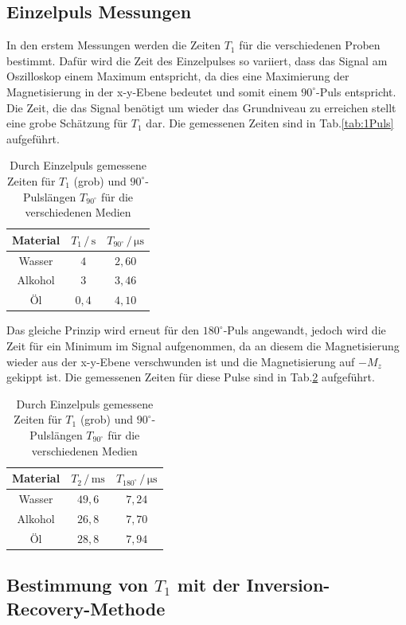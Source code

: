 \documentclass[numbers=noenddot,a4paper,notitlepage,twoside,BCOR15mm]{scrartcl}
\begin{document}
	\subsection{Einzelpuls Messungen}
	\label{kap:A1}
	In den erstem Messungen werden die Zeiten $T_1$ für die verschiedenen Proben bestimmt. Dafür wird die Zeit des Einzelpulses so variiert, dass das Signal am Oszilloskop einem Maximum entspricht, da dies eine Maximierung der Magnetisierung in der x-y-Ebene bedeutet und somit einem $90^\circ$-Puls entspricht. Die Zeit, die das Signal benötigt um wieder das Grundniveau zu erreichen stellt eine grobe Schätzung für $T_1$ dar. Die gemessenen Zeiten sind in Tab.\ref{tab:1Puls} aufgeführt.
	\begin{table}[h]
		\centering
		\caption{Durch Einzelpuls gemessene Zeiten für $T_1$ (grob) und $90^\circ$-Pulslängen $T_{90^\circ}$ für die verschiedenen Medien}
		\begin{tabular}{c c c}
			Material & $T_1\,/\,\mathrm{s}$ &$ T_{90^\circ}\,/\,\mathrm{\mu s}$ \\ \hline
			Wasser 	& $4$   & $2,60$ \\
			Alkohol & $3$   & $3,46$ \\
			Öl 		& $0,4$ & $4,10$
		\end{tabular}
		\label{tab:1Puls90}
	\end{table}
	Das gleiche Prinzip wird erneut für den $180^\circ$-Puls angewandt, jedoch wird die Zeit für ein Minimum im Signal aufgenommen, da an diesem die Magnetisierung wieder aus der x-y-Ebene verschwunden ist und die Magnetisierung auf $-M_z$ gekippt ist. Die gemessenen Zeiten für diese Pulse sind in Tab.\ref{tab:1Puls180} aufgeführt.
		\begin{table}[h]
			\centering
			\caption{Durch Einzelpuls gemessene Zeiten für $T_1$ (grob) und $90^\circ$-Pulslängen $T_{90^\circ}$ für die verschiedenen Medien}
			\begin{tabular}{c c c}
				Material & $T_2\,/\,\mathrm{ms}$ &$ T_{180^\circ}\,/\,\mathrm{\mu s}$ \\ \hline
				Wasser 	& $49,6$ & $7,24$ \\
				Alkohol & $26,8$ & $7,70$ \\
				Öl 		& $28,8$ & $7,94$
			\end{tabular}
			\label{tab:1Puls180}
		\end{table}
	\newpage

	\subsection{Bestimmung von $T_1$ mit der Inversion-Recovery-Methode}
	
\end{document}
